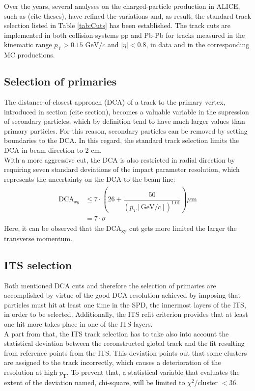 \documentclass[12pt,a4paper]{report}
\begin{document}
Over the years, several analyses on the charged-particle production in ALICE, such as (cite theses), have refined the variations and, as result, the standard track selection listed in Table \ref{tab:Cuts} has been established. The track cuts are implemented in both collision systems pp and Pb-Pb for tracks measured in the kinematic range $p_\text{T} > 0.15\text{ GeV}/c$ and $|\eta| < 0.8$, in data and in the corresponding MC productions. 
\iffalse
\subsection{Selection of primaries}
\label{sec:SelOfPrim}
The distance-of-closest approach (DCA) of a track to the primary vertex, introduced in section (cite section), becomes a valuable variable in the supression of secondary particles, which by definition tend to have much larger values than primary particles. For this reason, secondary particles can be removed by setting boundaries to the DCA. In this regard, the standard track selection limits the DCA in beam direction to $2$ cm.\\
With a more aggressive cut, the DCA is also restricted in radial direction by requiring seven standard deviations of the impact parameter resolution, which represents the uncertainty on the DCA to the beam line: %
\begin{align}
\begin{split}
\text{DCA}_{xy} &\leq 7 \cdot \left(26 + \dfrac{50}{(p_{T}[\text{GeV}/c])^{1.01}}\right) \mu \text{m} \\
& = 7\cdot \sigma
\end{split}
\end{align}
Here, it can be observed that the DCA$_{\text{xy}}$ cut gets more limited the larger the transverse momentum. 
\subsection{ITS selection}
Both mentioned DCA cuts and therefore the selection of primaries are accomplished by virtue of the good DCA resolution achieved by imposing that particles must hit at least one time in the SPD, the innermost layers of the ITS, in order to be selected. Additionally, the ITS refit criterion provides that at least one hit more takes place in one of the ITS layers. \\
A part from that, the ITS track selection has to take also into account the statistical deviation between the reconstructed global track and the fit resulting from reference points from the ITS. This deviation points out that some clusters are assigned to the track incorrectly, which causes a  deterioration of the \pt resolution at high $p_\text{T}$. To prevent that, a statistical variable that evaluates the extent of the deviation named, chi-square, will be limited to $\chi^2$/cluster $< 36$.
\end{document}
